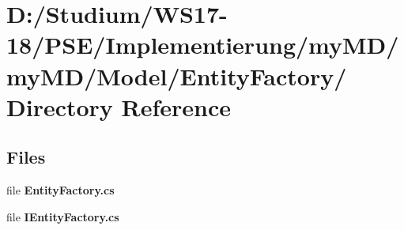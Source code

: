 \hypertarget{dir_D_3A_2FStudium_2FWS17_2D18_2FPSE_2FImplementierung_2FmyMD_2FmyMD_2FModel_2FEntityFactory_2F}{
\section{D:/Studium/WS17-18/PSE/Implementierung/my\-MD/my\-MD/Model/Entity\-Factory/ Directory Reference}
\label{dir_D_3A_2FStudium_2FWS17_2D18_2FPSE_2FImplementierung_2FmyMD_2FmyMD_2FModel_2FEntityFactory_2F}
}


\subsection*{Files}
\begin{CompactItemize}
\item 
file {\bf Entity\-Factory.cs}
\item 
file {\bf IEntity\-Factory.cs}
\end{CompactItemize}
